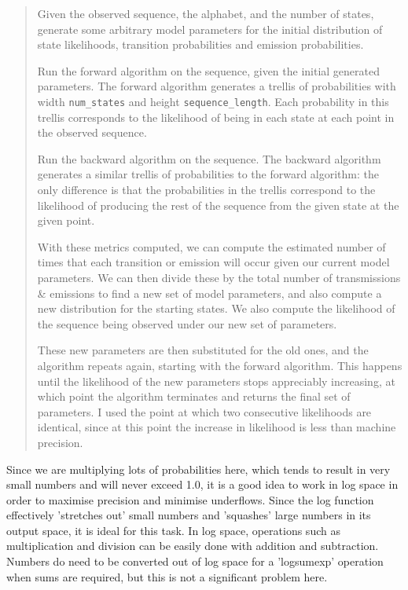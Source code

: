 \documentclass[11pt]{article} %
\begin{document}
\begin{quote}
	Given the observed sequence, the alphabet, and the number of states, generate some arbitrary model parameters for the initial distribution of state likelihoods, transition probabilities and emission probabilities.
	
	Run the forward algorithm on the sequence, given the initial generated parameters. The forward algorithm generates a trellis of probabilities with width \texttt{num\_states} and height \texttt{sequence\_length}. Each probability in this trellis corresponds to the likelihood of being in each state at each point in the observed sequence.
	
	Run the backward algorithm on the sequence. The backward algorithm generates a similar trellis of probabilities to the forward algorithm: the only difference is that the probabilities in the trellis correspond to the likelihood of producing the rest of the sequence from the given state at the given point.
	
	With these metrics computed, we can compute the estimated number of times that each transition or emission will occur given our current model parameters. We can then divide these by the total number of transmissions \& emissions to find a new set of model parameters, and also compute a new distribution for the starting states. We also compute the likelihood of the sequence being observed under our new set of parameters.
	
	These new parameters are then substituted for the old ones, and the algorithm repeats again, starting with the forward algorithm. This happens until the likelihood of the new parameters stops appreciably increasing, at which point the algorithm terminates and returns the final set of parameters. I used the point at which two consecutive likelihoods are identical, since at this point the increase in likelihood is less than machine precision.
\end{quote}

Since we are multiplying lots of probabilities here, which tends to result in very small numbers and will never exceed 1.0, it is a good idea to work in log space in order to maximise precision and minimise underflows. Since the log function effectively 'stretches out' small numbers and 'squashes' large numbers in its output space, it is ideal for this task. In log space, operations such as multiplication and division can be easily done with addition and subtraction. Numbers do need to be converted out of log space for a 'logsumexp' operation when sums are required, but this is not a significant problem here.
\end{document}
